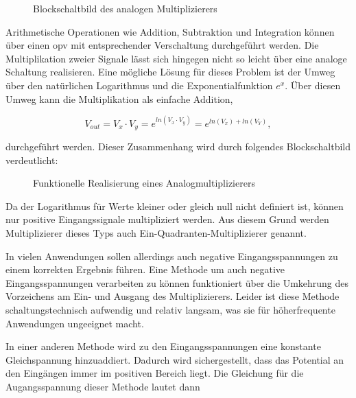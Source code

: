 \documentclass[../main.tex]{subfiles}
\begin{document}
\begin{figure}[H]
  \centering
  \resizebox{0.4\textwidth}{!}{}
  \caption{Blockschaltbild des analogen Multiplizierers}
  \label{fig:bsb_einfacher_multi}
\end{figure}

Arithmetische Operationen wie Addition, Subtraktion und Integration können über einen \gls{opv} mit entsprechender Verschaltung durchgeführt werden. Die Multiplikation zweier Signale lässt sich hingegen nicht so leicht über eine analoge Schaltung realisieren. Eine mögliche Lösung für dieses Problem ist der Umweg über den natürlichen Logarithmus und die Exponentialfunktion $e^x$. Über diesen Umweg kann die Multiplikation als einfache Addition, \par

\begin{equation*}
V_{out}=V_x \cdot V_y = e^{ln(V_x \cdot V_y)} = e^{ln(V_x) + ln(V_Y)},
\end{equation*}

durchgeführt werden. \cite{mult_wiki} Dieser Zusammenhang wird durch folgendes Blockschaltbild verdeutlicht:\par

\begin{figure}[H]
  \centering
  \resizebox{0.8\textwidth}{!}{}
  \caption{Funktionelle Realisierung eines Analogmultiplizierers \cite{mult_wiki}}
  \label{fig:bsb_multi_real}
\end{figure}

\medskip
Da der Logarithmus für Werte kleiner oder gleich null nicht definiert ist, können nur positive Eingangssignale multipliziert werden. Aus diesem Grund werden Multiplizierer dieses Typs auch Ein-Quadranten-Multiplizierer genannt.\par 
\medskip
In vielen Anwendungen sollen allerdings auch negative Eingangsspannungen zu einem korrekten Ergebnis führen. Eine Methode um auch negative Eingangsspannungen verarbeiten zu können funktioniert über die Umkehrung des Vorzeichens am Ein- und Ausgang des Multiplizierers. Leider ist diese Methode schaltungstechnisch aufwendig und relativ langsam, was sie für höherfrequente Anwendungen ungeeignet macht. \cite{halbleiter_4Quad}\par
\medskip

In einer anderen Methode wird zu den Eingangsspannungen eine konstante Gleichspannung hinzuaddiert. Dadurch wird sichergestellt, dass das Potential an den Eingängen immer im positiven Bereich liegt. Die Gleichung für die Augangsspannung dieser Methode lautet dann\par
\end{document}
